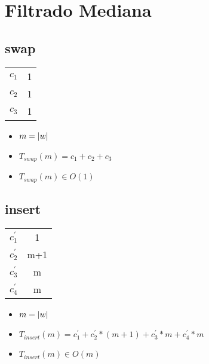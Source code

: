 \documentclass{article}
\begin{document}
    \section*{Filtrado Mediana}

    \subsection*{swap}

    \begin{minipage}{0.70\textwidth}
        
    \end{minipage}
    \hfill
    \begin{minipage}{0.25\textwidth}
        \begin{tabular}{|c|c}
            $c_1$ & 1 \\
            $c_2$ & 1 \\
            $c_3$ & 1 \\
        \end{tabular}
    \end{minipage}

    \begin{itemize}
        \item $m = |w|$
        \item $T_{swap}(m) = c_1 + c_2 + c_3 $
        \item $T_{swap}(m) \in O(1)$
    \end{itemize}

    \subsection*{insert}

    \begin{minipage}{0.70\textwidth}
        
    \end{minipage}
    \hfill
    \begin{minipage}{0.25\textwidth}
        \begin{tabular}{|c|c}
            $c^{\prime}_1$ & 1 \\
            $c^{\prime}_2$ & m+1 \\
            $c^{\prime}_3$ & m \\
            $c^{\prime}_4$ & m \\
        \end{tabular}
    \end{minipage}

    \begin{itemize}
        \item $m = |w|$
        \item $T_{insert}(m) = c^{\prime}_1 + c^{\prime}_2 * (m+1) + c^{\prime}_3 * m + c^{\prime}_4 * m $
        \item $T_{insert}(m) \in O(m)$
    \end{itemize}
\end{document}
